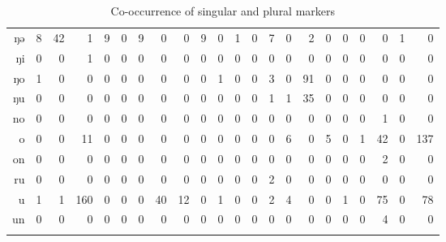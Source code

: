\begin{table}
\begin{tabular}{rrrrrrrrrrrrrrrrrrrrrr}
      ŋə & 8  & 42 & 1   & 9  & 0  & 9   & 0  & 0    & 9  & 0  & 1 & 0  & 7  & 0  & 2  & 0 & 0  & 0  & 0  & 1  & 0   \\
      ŋi & 0  & 0  & 1   & 0  & 0  & 0   & 0  & 0    & 0  & 0  & 0 & 0  & 0  & 0  & 0  & 0 & 0  & 0  & 0  & 0  & 0   \\
      ŋo & 1  & 0  & 0   & 0  & 0  & 0   & 0  & 0    & 0  & 1  & 0 & 0  & 3  & 0  & 91 & 0 & 0  & 0  & 0  & 0  & 0   \\
      ŋu & 0  & 0  & 0   & 0  & 0  & 0   & 0  & 0    & 0  & 0  & 0 & 0  & 1  & 1  & 35 & 0 & 0  & 0  & 0  & 0  & 0   \\
      no & 0  & 0  & 0   & 0  & 0  & 0   & 0  & 0    & 0  & 0  & 0 & 0  & 0  & 0  & 0  & 0 & 0  & 0  & 1  & 0  & 0   \\
      o  & 0  & 0  & 11  & 0  & 0  & 0   & 0  & 0    & 0  & 0  & 0 & 0  & 0  & 6  & 0  & 5 & 0  & 1  & 42 & 0  & 137 \\
      on & 0  & 0  & 0   & 0  & 0  & 0   & 0  & 0    & 0  & 0  & 0 & 0  & 0  & 0  & 0  & 0 & 0  & 0  & 2  & 0  & 0   \\
      ru & 0  & 0  & 0   & 0  & 0  & 0   & 0  & 0    & 0  & 0  & 0 & 0  & 2  & 0  & 0  & 0 & 0  & 0  & 0  & 0  & 0   \\
      u  & 1  & 1  & 160 & 0  & 0  & 0   & 40 & 12   & 0  & 1  & 0 & 0  & 2  & 4  & 0  & 0 & 1  & 0  & 75 & 0  & 78  \\
      un & 0  & 0  & 0   & 0  & 0  & 0   & 0  & 0    & 0  & 0  & 0 & 0  & 0  & 0  & 0  & 0 & 0  & 0  & 4  & 0  & 0   \\
      \lspbottomrule
    \end{tabular}
    \caption{Co-occurrence of singular and plural markers}\label{tab:comarkers-kasem}
\end{table}

